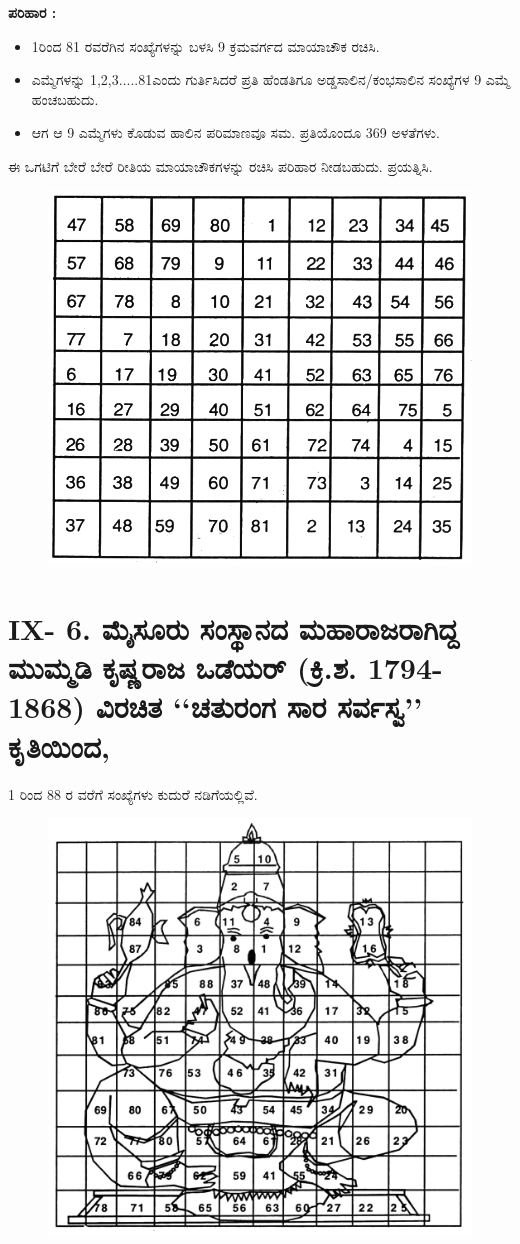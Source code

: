 \textbf{ಪರಿಹಾರ :}
\begin{itemize}
	\item 1ರಿಂದ 81 ರವರೆಗಿನ ಸಂಖ್ಯೆಗಳನ್ನು ಬಳಸಿ 9 ಕ್ರಮವರ್ಗದ ಮಾಯಾಚೌಕ ರಚಿಸಿ.
	\item ಎಮ್ಮೆಗಳನ್ನು 1,2,3.....81ಎಂದು ಗುರ್ತಿಸಿದರೆ ಪ್ರತಿ ಹೆಂಡತಿಗೂ ಅಡ್ಡಸಾಲಿನ/ಕಂಭಸಾಲಿನ ಸಂಖ್ಯೆಗಳ 9 ಎಮ್ಮೆ ಹಂಚಬಹುದು.
	\item ಆಗ ಆ 9 ಎಮ್ಮೆಗಳು ಕೊಡುವ ಹಾಲಿನ ಪರಿಮಾಣವೂ ಸಮ. ಪ್ರತಿಯೊಂದೂ 369 ಅಳತೆಗಳು.
\end{itemize}
ಈ ಒಗಟಿಗೆ ಬೇರೆ ಬೇರೆ ರೀತಿಯ ಮಾಯಾಚೌಕಗಳನ್ನು ರಚಿಸಿ ಪರಿಹಾರ ನೀಡಬಹುದು. ಪ್ರಯತ್ನಿಸಿ.
\begin{figure}[H]
\includegraphics{src/figures/chap8/fig8-12.jpg}
\end{figure}

\section*{IX- 6. ಮೈಸೂರು ಸಂಸ್ಥಾನದ ಮಹಾರಾಜರಾಗಿದ್ದ ಮುಮ್ಮಡಿ ಕೃಷ್ಣರಾಜ ಒಡೆಯರ್ (ಕ್ರಿ.ಶ. 1794-1868) ವಿರಚಿತ ‘‘ಚತುರಂಗ ಸಾರ ಸರ್ವಸ್ವ’’ ಕೃತಿಯಿಂದ,}

1 ರಿಂದ 88 ರ ವರೆಗೆ ಸಂಖ್ಯೆಗಳು ಕುದುರೆ ನಡಿಗೆಯಲ್ಲಿವೆ.
\begin{figure}[H]
\includegraphics{src/figures/chap8/fig8-13.jpg}
\end{figure}
